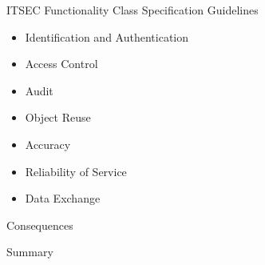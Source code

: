 \documentclass[xcolor=dvipsname,t]{beamer}
\begin{document}
\begin{frame} {ITSEC Functionality Class Specification Guidelines}
    \begin{itemize}
        \item Identification and Authentication
        \item Access Control
        \item Audit
        \item Object Reuse
        \item Accuracy
        \item Reliability of Service
        \item Data Exchange
    \end{itemize}
\end{frame}

\begin{frame} {Consequences}
\end{frame}

\begin{frame} {Summary}
\end{frame}
\end{document}
